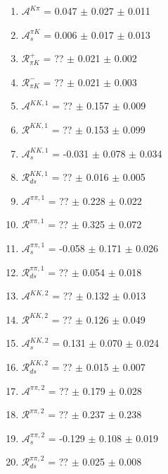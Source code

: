 \begin{enumerate}
\item $\mathcal{A}^{K\pi}$ = 0.047 $\pm$ 0.027 $\pm$ 0.011
\item $\mathcal{A}_s^{\pi K}$ = 0.006 $\pm$ 0.017 $\pm$ 0.013
\item $\mathcal{R}_{\pi K}^+$ = ?? $\pm$ 0.021 $\pm$ 0.002
\item $\mathcal{R}_{\pi K}^-$ = ?? $\pm$ 0.021 $\pm$ 0.003
\item $\mathcal{A}^{KK,1}$ = ?? $\pm$ 0.157 $\pm$ 0.009
\item $\mathcal{R}^{KK,1}$ = ?? $\pm$ 0.153 $\pm$ 0.099
\item $\mathcal{A}_s^{KK,1}$ = -0.031 $\pm$ 0.078 $\pm$ 0.034
\item $\mathcal{R}_{ds}^{KK,1}$ = ?? $\pm$ 0.016 $\pm$ 0.005
\item $\mathcal{A}^{\pi\pi,1}$ = ?? $\pm$ 0.228 $\pm$ 0.022
\item $\mathcal{R}^{\pi\pi,1}$ = ?? $\pm$ 0.325 $\pm$ 0.072
\item $\mathcal{A}_s^{\pi\pi,1}$ = -0.058 $\pm$ 0.171 $\pm$ 0.026
\item $\mathcal{R}_{ds}^{\pi\pi,1}$ = ?? $\pm$ 0.054 $\pm$ 0.018
\item $\mathcal{A}^{KK,2}$ = ?? $\pm$ 0.132 $\pm$ 0.013
\item $\mathcal{R}^{KK,2}$ = ?? $\pm$ 0.126 $\pm$ 0.049
\item $\mathcal{A}_s^{KK,2}$ = 0.131 $\pm$ 0.070 $\pm$ 0.024
\item $\mathcal{R}_{ds}^{KK,2}$ = ?? $\pm$ 0.015 $\pm$ 0.007
\item $\mathcal{A}^{\pi\pi,2}$ = ?? $\pm$ 0.179 $\pm$ 0.028
\item $\mathcal{R}^{\pi\pi,2}$ = ?? $\pm$ 0.237 $\pm$ 0.238
\item $\mathcal{A}_s^{\pi\pi,2}$ = -0.129 $\pm$ 0.108 $\pm$ 0.019
\item $\mathcal{R}_{ds}^{\pi\pi,2}$ = ?? $\pm$ 0.025 $\pm$ 0.008
\end{enumerate}
